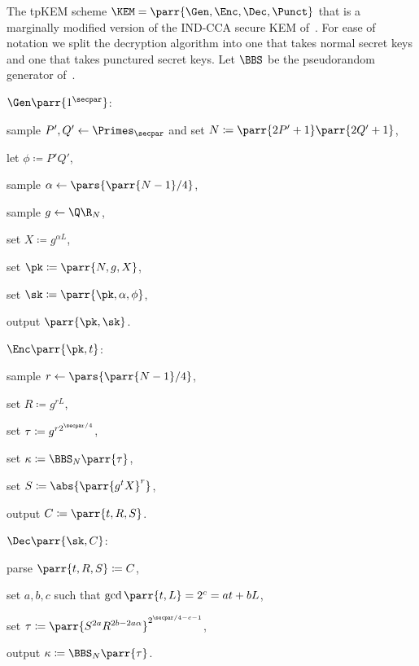 \begin{construction}\label{con:HK09-KEM}
    The tpKEM scheme \(\KEM = \parr{\Gen,\Enc,\Dec,\Punct}\) that is a marginally modified version of the IND-CCA secure KEM of~\textcite{EC:HofKil09}.
    For ease of notation we split the decryption algorithm into one that takes normal secret keys and one that takes punctured secret keys.
    Let \(\BBS\) be the pseudorandom generator of~\textcite{C:BluBluShu82}.
    \begin{sitemize}
        \item \(\Gen\parr{1^\secpar}\):
        \begin{sitemize}
            \item sample \(P',Q' \gets \Primes_\secpar\) and set \(N \coloneqq \parr{2P'+1} \parr{2Q'+1}\),
            \item let \(\phi \coloneqq P'Q'\),
            \item sample \(\alpha \gets \pars{\parr{N-1}/4}\),
            \item sample \(g \gets \Q\R_N\),
            \item set \(X \coloneqq g^{\alpha L}\),
            \item set \(\pk \coloneqq \parr{N,g,X}\),
            \item set \(\sk \coloneqq \parr{\pk,\alpha,\phi}\),
            \item output \(\parr{\pk,\sk}\).
        \end{sitemize}
        \item \(\Enc\parr{\pk,t}\):
        \begin{sitemize}
            \item sample \(r \gets \pars{\parr{N-1}/4}\),
            \item set \(R \coloneqq g^{r L}\),
            \item set \(\tau \coloneqq g^{r 2^{\secpar/4}}\),
            \item set \(\kappa \coloneqq \BBS_N\parr{\tau}\),
            \item set \(S \coloneqq \abs{\parr{g^t X}^r}\),
            \item output \(C \coloneqq \parr{t,R,S}\).
        \end{sitemize}
        \item \(\Dec\parr{\sk,C}\):
        \begin{sitemize}
            \item parse \(\parr{t,R,S} \coloneqq C\),
            \item set \(a,b,c\) such that \(\gcd\parr{t,L} = 2^c = a t + b L\),
            \item set \(\tau \coloneqq \parr{S^{2a} R^{2b-2a\alpha}}^{2^{\secpar/4-c-1}}\),
            \item output \(\kappa \coloneqq \BBS_N\parr{\tau}\).
        \end{sitemize}


\end{sitemize}
\end{construction}
